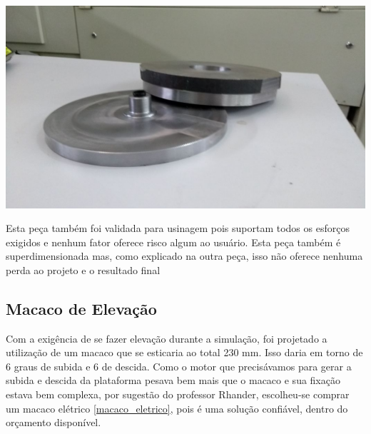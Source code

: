     \begin{center}
    	\includegraphics[scale=0.7]{figuras/mesa_giratoria_1}
        \label{mesa_giratoria_1}
    \end{center}

    Esta peça também foi validada para usinagem pois suportam todos os esforços exigidos e nenhum fator oferece risco algum ao usuário. Esta peça também é superdimensionada mas, como explicado na outra peça, isso não oferece nenhuma perda ao projeto e o resultado final

\subsection{Macaco de Elevação}

    Com a exigência de se fazer elevação durante a simulação, foi projetado a utilização de um macaco que se esticaria ao total 230 mm. Isso daria em torno de 6 graus de subida e 6 de descida. Como o motor que precisávamos para gerar a subida e descida da plataforma pesava bem mais que o macaco e sua fixação estava bem complexa, por sugestão do professor Rhander, escolheu-se comprar um macaco elétrico \ref{macaco_eletrico}, pois é uma solução confiável, dentro do orçamento disponível.

